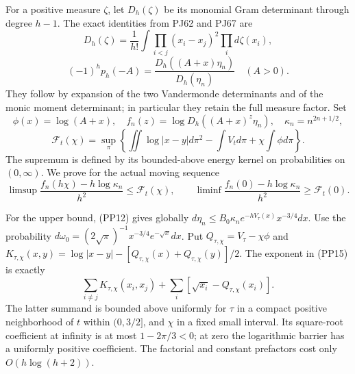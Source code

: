 \documentclass[10pt]{article}
\begin{document}
For a positive measure \(\zeta\), let \(D_h(\zeta)\) be its monomial Gram determinant through degree \(h-1\). The exact identities from PJ62 and PJ67 are \[
D_h(\zeta)=\frac1{h!}\int\prod_{i<j}(x_i-x_j)^2\prod_i d\zeta(x_i),
\tag{PP15}
\] \[
(-1)^hp_h(-A)=\frac{D_h((A+x)\eta_n)}{D_h(\eta_n)}\quad(A>0).
\tag{PP16}
\] They follow by expansion of the two Vandermonde determinants and of the monic moment determinant; in particular they retain the full measure factor. Set \[
\phi(x)=\log(A+x),\quad f_n(z)=\log D_h((A+x)^z\eta_n),
\quad \kappa_n=n^{2n+1/2},
\] \[
\mathcal F_t(\chi)=\sup_\pi
\left\{\iint\log|x-y|d\pi^2-\int V_t d\pi+\chi\int\phi d\pi\right\}.
\tag{PP17}
\] The supremum is defined by its bounded-above energy kernel on probabilities on \((0,\infty)\). We prove for the actual moving sequence \[
\limsup\frac{f_n(h\chi)-h\log\kappa_n}{h^2}
\le\mathcal F_t(\chi),\qquad
\liminf\frac{f_n(0)-h\log\kappa_n}{h^2}
\ge\mathcal F_t(0).
\tag{PP18}
\]

For the upper bound, (PP12) gives globally \(d\eta_n\le B_0\kappa_n e^{-hV_\tau(x)}x^{-3/4}dx\). Use the probability \(d\omega_0=(2\sqrt\pi)^{-1}x^{-3/4}e^{-\sqrt x}dx\). Put \(Q_{\tau,\chi}=V_\tau-\chi\phi\) and \(K_{\tau,\chi}(x,y)=\log|x-y|-[Q_{\tau,\chi}(x)+Q_{\tau,\chi}(y)]/2\). The exponent in (PP15) is exactly \[
\sum_{i\ne j}K_{\tau,\chi}(x_i,x_j)
+\sum_i[\sqrt{x_i}-Q_{\tau,\chi}(x_i)].
\tag{PP19}
\] The latter summand is bounded above uniformly for \(\tau\) in a compact positive neighborhood of \(t\) within \((0,3/2]\), and \(\chi\) in a fixed small interval. Its square-root coefficient at infinity is at most \(1-2\pi/3<0\); at zero the logarithmic barrier has a uniformly positive coefficient. The factorial and constant prefactors cost only \(O(h\log(h+2))\).
\end{document}
